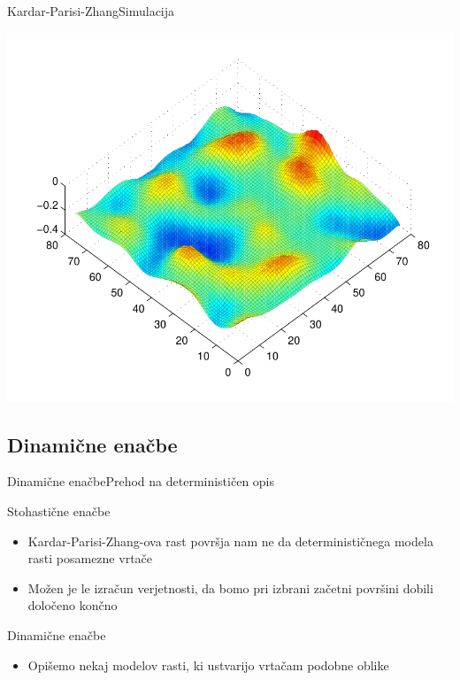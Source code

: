 \documentclass{beamer}
\begin{document}
\begin{frame}{Kardar-Parisi-Zhang}{Simulacija}
\begin{center}
  \includegraphics[width=.95\textwidth]{slike/KPZ-numericno}
\end{center}
\end{frame}


\subsection{Dinamične enačbe}

\begin{frame}{Dinamične enačbe}{Prehod na determinističen opis}
\begin{block}{Stohastične enačbe}
  \begin{itemize}
  \item
    Kardar-Parisi-Zhang-ova rast površja nam ne da determinističnega modela rasti posamezne vrtače
  \item
    Možen je le izračun verjetnosti, da bomo pri izbrani začetni površini dobili določeno končno
  \end{itemize}
\end{block}
\begin{block}{Dinamične enačbe}
  \begin{itemize}
  \item
    Opišemo nekaj modelov rasti, ki ustvarijo vrtačam podobne oblike
  \end{itemize}
\end{block}
\end{frame}
\end{document}
